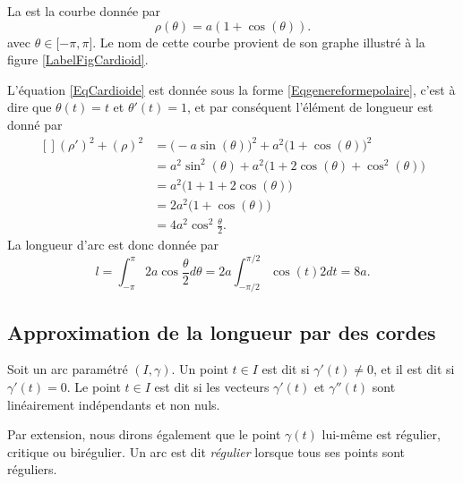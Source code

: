 \begin{example}
    La  est la courbe donnée par
    \begin{equation}        \label{EqCardioide}
        \rho(\theta)=a(1+\cos(\theta)).
    \end{equation}
    avec $\theta\in\mathopen[ -\pi , \pi \mathclose]$. Le nom de cette courbe provient de son graphe illustré à la figure \ref{LabelFigCardioid}.
    \newcommand{\CaptionFigCardioid}{Une cardioïde, $\rho=1+\cos(\theta)$.}
    

    L'équation \eqref{EqCardioide} est donnée sous la forme \eqref{Eqgenereformepolaire}, c'est à dire que $\theta(t)=t$ et $\theta'(t)=1$, et par conséquent l'élément de longueur est donné par
    \begin{equation}
        \begin{aligned}[]
            (\rho')^2+(\rho)^2&=\big( -a\sin(\theta) \big)^2+a^2\big( 1+\cos(\theta) \big)^2\\
                    &=a^2\sin^2(\theta)+a^2\big( 1+2\cos(\theta)+\cos^2(\theta) \big)\\
                    &=a^2\big( 1+1+2\cos(\theta) \big)\\
                    &=2a^2\big( 1+\cos(\theta) \big)\\
                    &=4a^2\cos^2\frac{ \theta }{2}.
        \end{aligned}
    \end{equation}
    La longueur d'arc est donc donnée par
    \begin{equation}
        l=\int_{-\pi}^{\pi}2a\cos\frac{ \theta }{2}d\theta=2a\int_{-\pi/2}^{\pi/2}\cos(t)2dt=8a.
    \end{equation}
\end{example}

\subsection{Approximation de la longueur par des cordes}

\begin{definition}
    Soit un arc paramétré $(I,\gamma)$. Un point $t\in I$ est dit  si $\gamma'(t)\neq 0$, et il est dit  si $\gamma'(t)=0$. Le point $t\in I$ est dit  si les vecteurs $\gamma'(t)$ et $\gamma''(t)$ sont linéairement indépendants et non nuls. 
    
    Par extension, nous dirons également que le point $\gamma(t)$ lui-même est régulier, critique ou birégulier. Un arc est dit \emph{régulier} lorsque tous ses points sont réguliers.
\end{definition}

